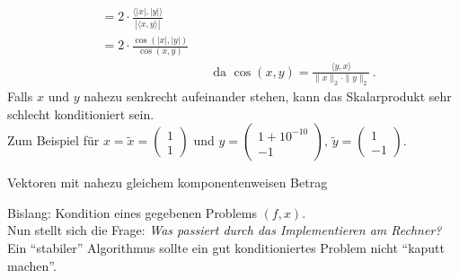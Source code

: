 \begin{Bspe}
\begin{enumerate}[a)]
\begin{align*}
                                                         &= 2\cdot \frac{\langle |x|,|y|\rangle}{|\langle x,y\rangle|} \\
                                                         &= 2 \cdot \frac{\cos(|x|, |y|)}{\cos(x,y)}  \\
                                                         &&&				\text{	da  }\cos(x,y) = \frac{\langle y,x \rangle}{\|x\|_2 \cdot \|y\|_2} \, . 
    \end{align*}
    Falls $x$ und $y$ nahezu senkrecht aufeinander stehen, kann das Skalarprodukt sehr schlecht konditioniert sein. \\
    Zum Beispiel für $x=\widetilde{x} = \begin{pmatrix} 1 \\1 \end{pmatrix}$
    und $y=\begin{pmatrix} 1+10^{-10} \\-1 \end{pmatrix},
    \, \widetilde{y}=\begin{pmatrix} 1 \\-1 \end{pmatrix}$. \\
    \begin{image}{Vektoren mit nahezu gleichem komponentenweisen Betrag}
    \end{image}
  \end{enumerate}	
\end{Bspe}

Bislang: Kondition eines gegebenen Problems $(f,x)$. \\
Nun stellt sich die Frage: \textit{Was passiert durch das Implementieren am Rechner? }\\
Ein \enquote{stabiler} Algorithmus sollte ein gut konditioniertes
Problem nicht \enquote{kaputt machen}.

